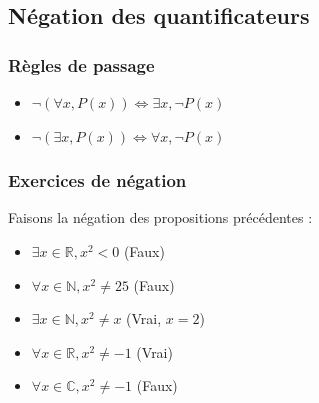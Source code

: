 \documentclass[a4paper,12pt]{article}
\begin{document}
\subsection{Négation des quantificateurs}
\subsubsection{Règles de passage}
\begin{itemize}
    \item $\neg (\forall x, P(x)) \iff \exists x, \neg P(x)$
    \item $\neg (\exists x, P(x)) \iff \forall x, \neg P(x)$
\end{itemize}

\subsubsection{Exercices de négation}
Faisons la négation des propositions précédentes :
\begin{itemize}
    \item $ \exists x \in \mathbb{R}, x^2 < 0 $ (Faux)
    \item $ \forall x \in \mathbb{N}, x^2 \neq 25 $ (Faux)
    \item $ \exists x \in \mathbb{N}, x^2 \neq x $ (Vrai, $x=2$)
    \item $ \forall x \in \mathbb{R}, x^2 \neq -1 $ (Vrai)
    \item $\forall x \in \mathbb{C}, x^2 \neq -1$ (Faux)
\end{itemize}
\end{document}
